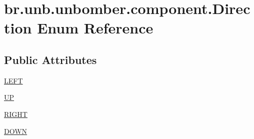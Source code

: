 \hypertarget{enumbr_1_1unb_1_1unbomber_1_1component_1_1_direction}{\section{br.\+unb.\+unbomber.\+component.\+Direction Enum Reference}
\label{enumbr_1_1unb_1_1unbomber_1_1component_1_1_direction}
}
\subsection*{Public Attributes}
\begin{DoxyCompactItemize}
\item 
\hyperlink{enumbr_1_1unb_1_1unbomber_1_1component_1_1_direction_a13dd31c7fec75b184bc1db7bcbc41318}{L\+E\+F\+T}
\item 
\hyperlink{enumbr_1_1unb_1_1unbomber_1_1component_1_1_direction_ad6284477e0be6b560ab3f4a2b5fe677a}{U\+P}
\item 
\hyperlink{enumbr_1_1unb_1_1unbomber_1_1component_1_1_direction_a986303841d09432802c74e2ee7966491}{R\+I\+G\+H\+T}
\item 
\hyperlink{enumbr_1_1unb_1_1unbomber_1_1component_1_1_direction_a4aff2b688038d287c0c4a68f5c408b5c}{D\+O\+W\+N}
\end{DoxyCompactItemize}


